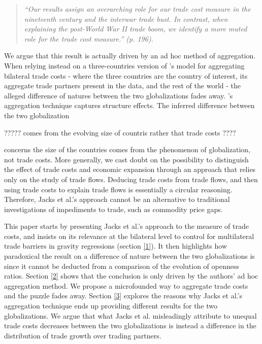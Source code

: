 \documentclass{article}
\begin{document}
\begin{quote}
\emph{``Our results assign an overarching role for our trade
cost measure in the nineteenth century and the interwar trade
bust. In contrast, when explaining the post-World War II trade
boom, we identify a more muted role for the trade cost
measure.'' (p. 196)}.
\end{quote}

We argue that this result is actually driven by an ad hoc
method of aggregation. When relying instead on a
three-countries version of \cite{AW2003}'s model for
aggregating bilateral trade costs - where the three countries
are the country of interest, its aggregate trade partners
present in the data, and the rest of the world - the alleged
difference of natures between the two globalizations fades
away. \cite{JMN2011}'s aggregation technique captures structure effects. The inferred difference between the
two globalization

????? comes from the evolving size of countris rather that trade costs ????

concerns the size of the countries comes from
the phenomenon of globalization, not trade costs. More generally, we
cast doubt on the possibility to distinguish the effect of trade costs and economic expansion through an approach that relies only on the study of trade
flows. Deducing trade costs from trade flows, and then using
trade costs to explain trade flows is essentially a circular
reasoning. Therefore, Jacks et al.'s approach cannot be an
alternative to traditional investigations of impediments to
trade, such as commodity price gaps.

This paper starts by presenting Jacks et al.'s approach to the
measure of trade costs, and insists on its relevance at the
bilateral level to control for multilateral trade barriers in
gravity regressions (section \ref{1}). It then highlights how paradoxical the
result on a difference of nature between the two globalizations
is since it cannot be deducted from a comparison of the
evolution of openness ratios. Section \ref{2} shows that the
conclusion is only driven by the authors' ad hoc aggregation
method. We propose a microfounded way to aggregate trade costs
and the puzzle fades away. Section \ref{3} explores the reasons
why Jacks et al.'s aggregation technique ends up providing
different results for the two globalizations. We argue that
what Jacks et al. misleadingly attribute to unequal trade costs
decreases between the two globalizations is instead a
difference in the distribution of trade growth over trading
partners.
\end{document}
